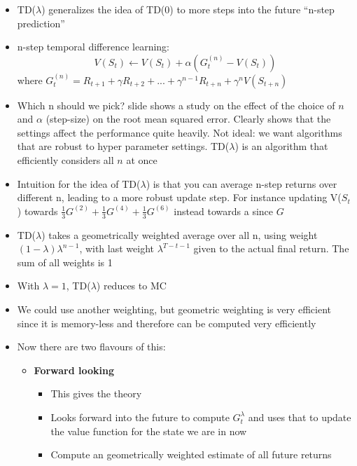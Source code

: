 \documentclass{article}
\begin{document}
\begin{itemize}
    \item TD($\lambda$) generalizes the idea of TD(0) to more steps into the future ``n-step prediction''
    \item n-step temporal difference learning:
        \begin{equation}
            V(S_t) \leftarrow V(S_t)+\alpha \left( G_t^{(n)}-V(S_t) \right)
        \end{equation}
        where $G_t^{(n)}=R_{t+1}+\gamma R_{t+2} + ... + \gamma^{n-1} R_{t+n} + \gamma^n V(S_{t+n})$
    \item Which n should we pick? slide shows a study on the effect of the choice of $n$ and $\alpha$ (step-size) on the root mean squared error. Clearly shows that the settings affect the performance quite heavily. Not ideal: we want algorithms that are robust to hyper parameter settings. TD($\lambda$) is an algorithm that efficiently considers all $n$ at once
    \item Intuition for the idea of TD($\lambda$) is that you can average n-step returns over different n, leading to a more robust update step. For instance updating V($S_t$) towards $\frac{1}{3}G^{(2)} + \frac{1}{3}G^{(4)} + \frac{1}{3}G^{(6)}$ instead towards a since $G$
    \item TD($\lambda$) takes a geometrically weighted average over all n, using weight $(1-\lambda)\lambda^{n-1}$, with last weight $\lambda^{T-t-1}$ given to the actual final return. The sum of all weights is 1
    \item With $\lambda=1$, TD($\lambda$) reduces to MC
    \item We could use another weighting, but geometric weighting is very efficient since it is memory-less and therefore can be computed very efficiently
    \item Now there are two flavours of this:
    \begin{itemize}
        \item \textbf{Forward looking}
        \begin{itemize}
            \item This gives the theory
            \item Looks forward into the future to compute $G_t^\lambda$ and uses that to update the value function for the state we are in now
            \item Compute an geometrically weighted estimate of all future returns
            \begin{equation}

\end{equation}
\end{itemize}
\end{itemize}
\end{itemize}
\end{document}
